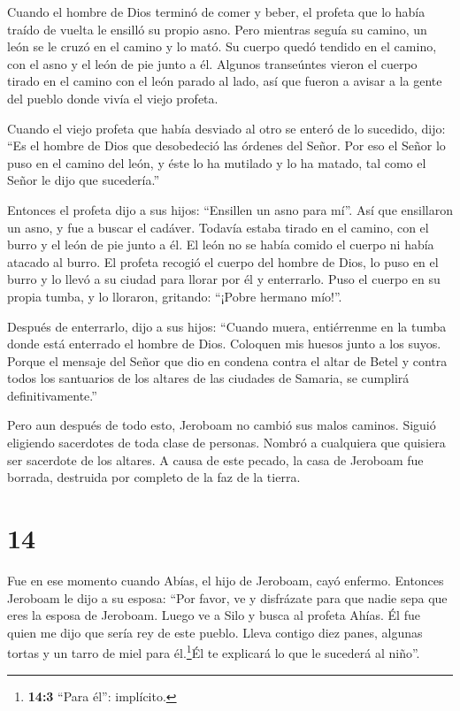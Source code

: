  Cuando el hombre de Dios terminó de comer y beber, el
profeta que lo había traído de vuelta le ensilló su propio asno.
 Pero mientras seguía su camino, un león se le cruzó en el
camino y lo mató. Su cuerpo quedó tendido en el camino, con el asno y el
león de pie junto a él.  Algunos transeúntes vieron el
cuerpo tirado en el camino con el león parado al lado, así que fueron a
avisar a la gente del pueblo donde vivía el viejo profeta.

 Cuando el viejo profeta que había desviado al otro se
enteró de lo sucedido, dijo: ``Es el hombre de Dios que desobedeció las
órdenes del Señor. Por eso el Señor lo puso en el camino del león, y
éste lo ha mutilado y lo ha matado, tal como el Señor le dijo que
sucedería.''

 Entonces el profeta dijo a sus hijos: ``Ensillen un asno
para mí''. Así que ensillaron un asno,  y fue a buscar el
cadáver. Todavía estaba tirado en el camino, con el burro y el león de
pie junto a él. El león no se había comido el cuerpo ni había atacado al
burro.  El profeta recogió el cuerpo del hombre de Dios, lo
puso en el burro y lo llevó a su ciudad para llorar por él y enterrarlo.
 Puso el cuerpo en su propia tumba, y lo lloraron,
gritando: ``¡Pobre hermano mío!''.

 Después de enterrarlo, dijo a sus hijos: ``Cuando muera,
entiérrenme en la tumba donde está enterrado el hombre de Dios. Coloquen
mis huesos junto a los suyos.  Porque el mensaje del Señor
que dio en condena contra el altar de Betel y contra todos los
santuarios de los altares de las ciudades de Samaria, se cumplirá
definitivamente.''

 Pero aun después de todo esto, Jeroboam no cambió sus
malos caminos. Siguió eligiendo sacerdotes de toda clase de personas.
Nombró a cualquiera que quisiera ser sacerdote de los altares.
 A causa de este pecado, la casa de Jeroboam fue borrada,
destruida por completo de la faz de la tierra.

\hypertarget{section-13}{%
\section{14}\label{section-13}}

 Fue en ese momento cuando Abías, el hijo de Jeroboam, cayó
enfermo.  Entonces Jeroboam le dijo a su esposa: ``Por
favor, ve y disfrázate para que nadie sepa que eres la esposa de
Jeroboam. Luego ve a Silo y busca al profeta Ahías. Él fue quien me dijo
que sería rey de este pueblo.  Lleva contigo diez panes,
algunas tortas y un tarro de miel para él.\footnote{\textbf{14:3} ``Para
  él'': implícito.}Él te explicará lo que le sucederá al niño''.

